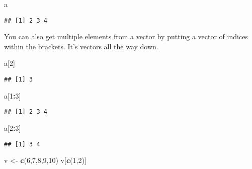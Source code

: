 \documentclass[
]{article}
\newenvironment{Shaded}{\begin{snugshade}}{\end{snugshade}}
\newcommand{\DecValTok}[1]{\textcolor[rgb]{0.00,0.00,0.81}{#1}}
\newcommand{\KeywordTok}[1]{\textcolor[rgb]{0.13,0.29,0.53}{\textbf{#1}}}
\newcommand{\NormalTok}[1]{#1}
\newcommand{\OperatorTok}[1]{\textcolor[rgb]{0.81,0.36,0.00}{\textbf{#1}}}
\newcommand{\StringTok}[1]{\textcolor[rgb]{0.31,0.60,0.02}{#1}}
\begin{document}
\begin{Shaded}
\begin{Highlighting}[]
\NormalTok{a}
\end{Highlighting}
\end{Shaded}

\begin{verbatim}
## [1] 2 3 4
\end{verbatim}

You can also get multiple elements from a vector by putting a vector of
indices within the brackets. It's vectors all the way down.

\begin{Shaded}
\begin{Highlighting}[]
\NormalTok{a[}\DecValTok{2}\NormalTok{]}
\end{Highlighting}
\end{Shaded}

\begin{verbatim}
## [1] 3
\end{verbatim}

\begin{Shaded}
\begin{Highlighting}[]
\NormalTok{a[}\DecValTok{1}\OperatorTok{:}\DecValTok{3}\NormalTok{]}
\end{Highlighting}
\end{Shaded}

\begin{verbatim}
## [1] 2 3 4
\end{verbatim}

\begin{Shaded}
\begin{Highlighting}[]
\NormalTok{a[}\DecValTok{2}\OperatorTok{:}\DecValTok{3}\NormalTok{]}
\end{Highlighting}
\end{Shaded}

\begin{verbatim}
## [1] 3 4
\end{verbatim}

\begin{Shaded}
\begin{Highlighting}[]
\NormalTok{v <-}\StringTok{ }\KeywordTok{c}\NormalTok{(}\DecValTok{6}\NormalTok{,}\DecValTok{7}\NormalTok{,}\DecValTok{8}\NormalTok{,}\DecValTok{9}\NormalTok{,}\DecValTok{10}\NormalTok{)}
\NormalTok{v[}\KeywordTok{c}\NormalTok{(}\DecValTok{1}\NormalTok{,}\DecValTok{2}\NormalTok{)]}
\end{Highlighting}
\end{Shaded}
\end{document}
